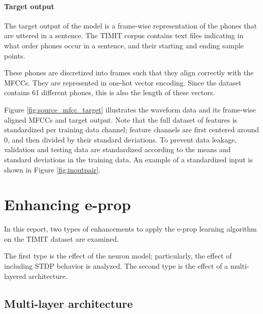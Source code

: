 		\paragraph{Target output}

			The target output of the model is a frame-wise representation of the phones that are uttered in a sentence.
			The TIMIT corpus contains text files indicating in what order phones occur in a sentence, and their starting and ending sample points.

			These phones are discretized into frames such that they align correctly with the MFCCs.
			They are represented in one-hot vector encoding.
			Since the dataset contains 61 different phones, this is also the length of these vectors.

			Figure \ref{fig:source_mfcc_target} illustrates the waveform data and its frame-wise aligned MFCCs and target output.
			Note that the full dataset of features is standardized per training data channel; feature channels are first centered around 0, and then divided by their standard deviations.
			To prevent data leakage, validation and testing data are standardized according to the means and standard deviations in the training data.
			An example of a standardized input is shown in Figure \ref{fig:inoutpair}.

\section{Enhancing e-prop}

	In this report, two types of enhancements to apply the e-prop learning algorithm on the TIMIT dataset are examined.

	The first type is the effect of the neuron model; particularly, the effect of including STDP behavior is analyzed.
	The second type is the effect of a multi-layered architecture.

	\subsection{Multi-layer architecture}\label{sec:ml_arch}

